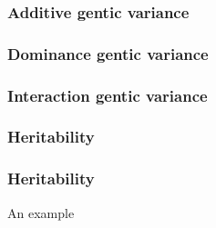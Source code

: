 \begin{frame}
\frametitle{Additive gentic variance}
\end{frame}

\begin{frame}
\frametitle{Dominance gentic variance}
\end{frame}

\begin{frame}
\frametitle{Interaction gentic variance}
\end{frame}

\begin{frame}
\frametitle{Heritability}
\end{frame}

\begin{frame}
\frametitle{Heritability}
\begin{block}{An example}
\end{block}
\end{frame}



